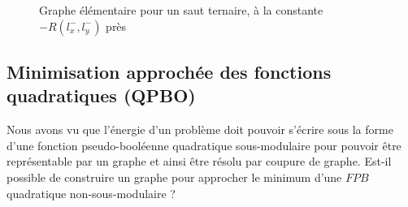 \documentclass[../main/These_Mathias_Paget.tex]{subfiles}
\begin{document}
\begin{figure}
\begin{center}

\end{center}
\caption{Graphe élémentaire pour un saut ternaire, à la constante $-R(l_x^-,l_y^-)$ près}
\label{fig:graph_ele_tern}
\end{figure}

\subsection{Minimisation approchée des fonctions quadratiques (QPBO)}
	\label{ss:n_submod}
	Nous avons vu que l’énergie d'un problème doit pouvoir s’écrire sous la forme d'une fonction pseudo-booléenne quadratique sous-modulaire pour pouvoir être représentable par un graphe et ainsi être résolu par coupure de graphe. Est-il possible de construire un graphe pour approcher le minimum d'une $FPB$ quadratique non-sous-modulaire ?
	
\end{document}
